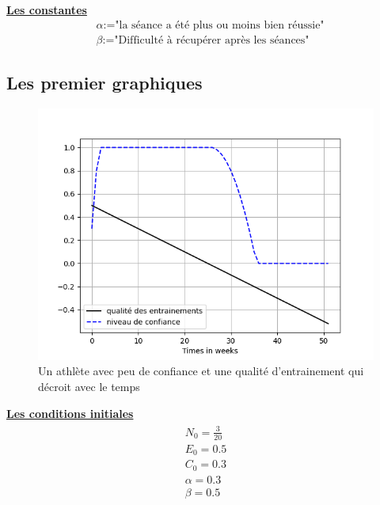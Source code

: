 \documentclass[
]{article}
\begin{document}
	\underline{\textbf{Les constantes}}
	\newline
	\begin{align}
		&\text{$\alpha$:="la séance a été plus ou moins bien réussie"} \\
		&\text{$\beta$:="Difficulté à récupérer après les séances"}	\end{align}
	
	\hypertarget{ss2}{%
	\subsection{Les premier graphiques }\label{ss2}}
		
		\begin{figure}[H]
			\centering
			\includegraphics[width=\textwidth]{Graph1SImu1}
			\caption{Un athlète avec peu de confiance et une qualité d'entrainement qui décroit avec le temps}
			\label{fig:fig1_1}
		\end{figure}
		
		\underline{\textbf{Les conditions initiales}}
		\begin{align*}
			\boxed{\begin{array}{c} N_0=\frac{3}{20} \\ E_0=0.5 \\
					C_0=0.3 \\
				\alpha=0.3 \\
				\beta=0.5
				\end{array}}
		\end{align*}
		
\end{document}
